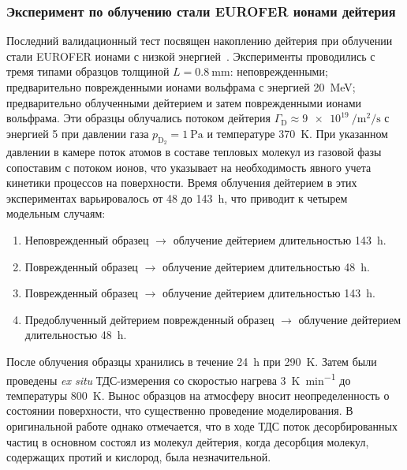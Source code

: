 \subsubsection{Эксперимент по облучению стали EUROFER ионами дейтерия}
Последний валидационный тест посвящен накоплению дейтерия при облучении стали EUROFER ионами с низкой энергией~\cite{Schmid2023_1}. Эксперименты проводились с тремя типами образцов толщиной \(L=\SI{0.8}{\milli\meter}\): неповрежденными; предварительно поврежденными ионами вольфрама с энергией \SI{20}{\mega\electronvolt}; предварительно облученными дейтерием и затем поврежденными ионами вольфрама. Эти образцы облучались потоком дейтерия $\Gamma_\mathrm{D}\approx\SI{9e19}{\per\meter\squared\per\second}$ с энергией \SI{5}{} при давлении газа $p_\mathrm{D_2}=\SI{1}{\pascal}$ и температуре \SI{370}{K}. При указанном давлении в камере поток атомов в составе тепловых молекул из газовой фазы сопоставим с потоком ионов, что указывает на необходимость явного учета кинетики процессов на поверхности. Время облучения дейтерием в этих экспериментах варьировалось от \num{48} до \SI{143}{\hour}, что приводит к четырем модельным случаям:
\begin{enumerate}[beginpenalty=10000]
    \item Неповрежденный образец $\rightarrow$ облучение дейтерием длительностью \SI{143}{\hour}.
    \item Поврежденный образец $\rightarrow$ облучение дейтерием длительностью \SI{48}{\hour}.
    \item Поврежденный образец $\rightarrow$ облучение дейтерием длительностью \SI{143}{\hour}.
    \item Предоблученный дейтерием поврежденный образец $\rightarrow$ облучение дейтерием длительностью \SI{48}{\hour}.
\end{enumerate}
После облучения образцы хранились в течение \SI{24}{\hour} при \SI{290}{\kelvin}. Затем были проведены \textit{ex situ} ТДС-измерения со скоростью нагрева \SI{3}{\kelvin\per\minute} до температуры \SI{800}{\kelvin}. Вынос образцов на атмосферу вносит неопределенность о состоянии поверхности, что существенно проведение моделирования. В оригинальной работе однако отмечается, что в ходе ТДС поток десорбированных частиц в основном состоял из молекул дейтерия, когда десорбция молекул, содержащих протий и кислород, была незначительной.

